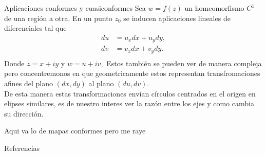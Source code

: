 \documentclass[xcolor=dvipsnames,10pt]{beamer}
\begin{document}
\begin{frame}{Aplicaciones conformes y cuasiconformes}
Sea $w=f(z)$ un homeomorfismo $C^1$ de una región a otra. En un punto $z_0$ se inducen aplicaciones lineales de diferenciales tal que
\begin{align*}
    du&=u_xdx+u_ydy,\\
    dv&=v_xdx+v_ydy.\\
\end{align*}
Donde $z=x+iy$ y $w=u+iv,$ Estos también se pueden ver de manera compleja pero concentremonos en que geometricamente  estos representan transfromaciones afines del plano $(dx,dy)$ al plano
$(du,dv).$\\

De esta manera estas transformaciones envían círculos centrados en el origen en elipses similares, es de nuestro interes ver la razón entre los ejes y como cambia su dirección.  
    
\end{frame}

\begin{frame}{}
    Aqui va lo de mapas conformes pero me raye
\end{frame}





\begin{frame}{Referencias}

\end{frame}
\end{document}
